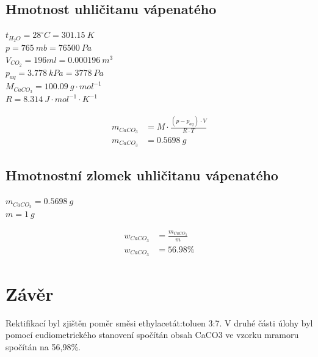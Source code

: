 \documentclass[13pt, a4paper, twoside]{article}z
\begin{document}
\subsection*{Hmotnost uhličitanu vápenatého}
$t_{H_2O}=28^{\circ}C = 301.15\: K$\\
$p = 765\: mb = 76500\:Pa$\\
$V_{CO_2}=196ml = 0.000196\:m^3$\\
$p_{aq}=3.778\:kPa=3778\:Pa$\\
$M_{CaCO_3} = 100.09 \: g\cdot mol^{-1}$\\
$R = 8.314\: J\cdot mol^{-1}\cdot K^{-1}$

\begin{align*}
    m_{CaCO_3} &= M\cdot\frac{(p-p_{aq})\cdot V}{R\cdot T}\\
    m_{CaCO_3} &= 0.5698 \: g
\end{align*}

\subsection*{Hmotnostní zlomek uhličitanu vápenatého}
$m_{CaCO_3}=0.5698\:g$\\
$m = 1\: g$

\begin{align*}
    w_{CaCO_3} &= \frac{m_{CaCO_3}}{m}\\
    w_{CaCO_3} &= 56.98\%
\end{align*}

\section*{Závěr}
Rektifikací byl zjištěn poměr směsi ethylacetát:toluen 3:7. V druhé části úlohy byl pomocí eudiometrického stanovení spočítán obsah CaCO3 ve vzorku mramoru spočítán na 56,98\%.
\end{document}
